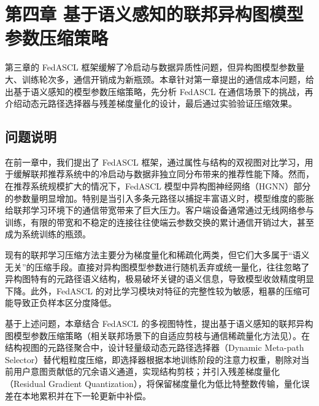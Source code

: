 \newpage

\section{第四章\texorpdfstring{\quad}{} 基于语义感知的联邦异构图模型参数压缩策略}
\label{chap:compression}
\setcounter{section}{4} \setcounter{subsection}{0}

第三章的 FedASCL 框架缓解了冷启动与数据异质性问题，但异构图模型参数量大、训练轮次多，通信开销成为新瓶颈。本章针对第一章提出的通信成本问题，给出基于语义感知的模型参数压缩策略，先分析 FedASCL 在通信场景下的挑战，再介绍动态元路径选择器与残差梯度量化的设计，最后通过实验验证压缩效果。

\subsection{问题说明}

在前一章中，我们提出了 FedASCL 框架，通过属性与结构的双视图对比学习，用于缓解联邦推荐系统中的冷启动与数据非独立同分布带来的推荐性能下降。然而，在推荐系统规模扩大的情况下，FedASCL 模型中异构图神经网络（HGNN）部分的参数量明显增加。特别是当引入多条元路径以捕捉丰富语义时，模型维度的膨胀给联邦学习环境下的通信带宽带来了巨大压力\cite{khan2025hufe}。客户端设备通常通过无线网络参与训练，有限的带宽和不稳定的连接往往使端云参数交换的累计通信开销过大，甚至成为系统训练的瓶颈\cite{fedcomloc2025}。

现有的联邦学习压缩方法主要分为梯度量化和稀疏化两类，但它们大多属于“语义无关”的压缩手段\cite{he2025feddt, jiang2022fedmp}。直接对异构图模型参数进行随机丢弃或统一量化，往往忽略了异构图特有的元路径语义结构，极易破坏关键的语义信息，导致模型收敛精度明显下降。此外，FedASCL 的对比学习模块对特征的完整性较为敏感，粗暴的压缩可能导致正负样本区分度降低。

基于上述问题，本章结合 FedASCL 的多视图特性，提出基于语义感知的联邦异构图模型参数压缩策略（相关联邦场景下的自适应剪枝与通信稀疏量化方法见\cite{jiang2022fedmp, zhu2023fedlp, fedcomloc2025}）。在结构视图的元路径聚合中，设计轻量级动态元路径选择器（Dynamic Meta-path Selector）替代粗粒度压缩，即选择器根据本地训练阶段的注意力权重，剔除对当前用户意图贡献低的冗余语义通道，实现结构剪枝；并引入残差梯度量化（Residual Gradient Quantization）\cite{yi2023fedlpq}，将保留梯度量化为低比特整数传输，量化误差在本地累积并在下一轮更新中补偿。

